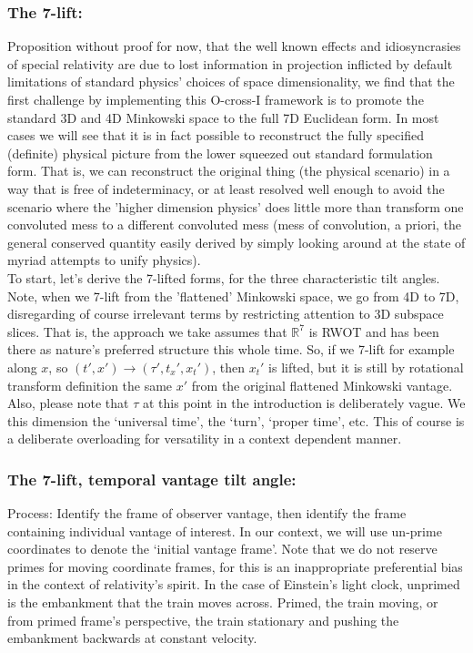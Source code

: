 \documentclass{article}
\begin{document}
\subsubsection*{The 7-lift:}
Proposition without proof for now, that the well known effects and idiosyncrasies of special relativity are due to lost information in projection inflicted by default limitations of standard physics' choices of space dimensionality, we find that the first challenge by implementing this O-cross-I framework is to promote the standard 3D and 4D Minkowski space to the full 7D Euclidean form. In most cases we will see that it is in fact possible to reconstruct the fully specified (definite) physical picture from the lower squeezed out standard formulation form. That is, we can reconstruct the original thing (the physical scenario) in a way that is free of indeterminacy, or at least resolved well enough to avoid the scenario where the 'higher dimension physics' does little more than transform one convoluted mess to a different convoluted mess (mess of convolution, a priori, the general conserved quantity easily derived by simply looking around at the state of myriad attempts to unify physics).\\

\noindent To start, let's derive the 7-lifted forms, for the three characteristic tilt angles. Note, when we 7-lift from the 'flattened' Minkowski space, we go from 4D to 7D, disregarding of course irrelevant terms by restricting attention to 3D subspace slices. That is, the approach we take assumes that $\mathbb{R}^7$ is RWOT and has been there as nature's preferred structure this whole time. So, if we 7-lift for example along $x$, so $(t', x') \rightarrow (\tau', t_x', x_t')$, then $x_t'$ is lifted, but it is still by rotational transform definition the same $x'$ from the original flattened Minkowski vantage. Also, please note that $\tau$ at this point in the introduction is deliberately vague. We this dimension the `universal time', the `turn', `proper time', etc. This of course is a deliberate overloading for versatility in a context dependent manner.\\

\subsubsection*{The 7-lift, temporal vantage tilt angle:}

Process: Identify the frame of observer vantage, then identify the frame containing individual vantage of interest. In our context, we will use un-prime coordinates to denote the `initial vantage frame'. Note that we do not reserve primes for moving coordinate frames, for this is an inappropriate preferential bias in the context of relativity's spirit. In the case of Einstein's light clock, unprimed is the embankment that the train moves across. Primed, the train moving, or from primed frame's perspective, the train stationary and pushing the embankment backwards at constant velocity.\\
\end{document}
